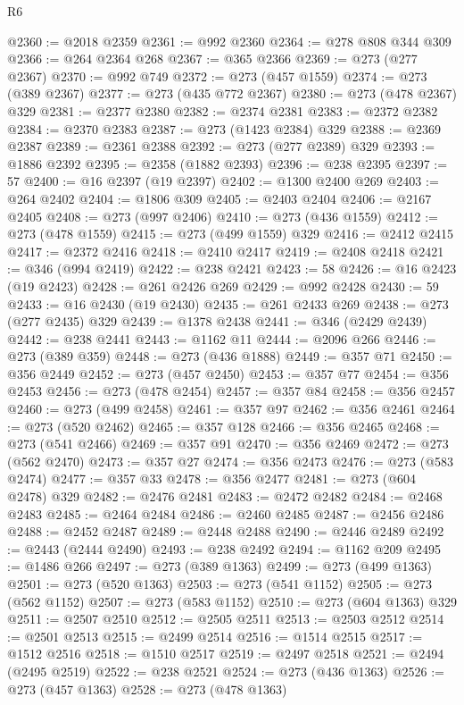 \begin{lexlean}{R6}
\begin{coremodule}
{{{{{{{{{{{{{{{{{{{@2360 := @2018 @2359
@2361 := @992 @2360
@2364 := @278 @808 @344 @309
@2366 := @264 @2364 @268
@2367 := @365 @2366
@2369 := @273 (@277 @2367)
@2370 := @992 @749
@2372 := @273 (@457 @1559)
@2374 := @273 (@389 @2367)
@2377 := @273 (@435 @772 @2367)
@2380 := @273 (@478 @2367) @329
@2381 := @2377 @2380
@2382 := @2374 @2381
@2383 := @2372 @2382
@2384 := @2370 @2383
@2387 := @273 (@1423 @2384) @329
@2388 := @2369 @2387
@2389 := @2361 @2388
@2392 := @273 (@277 @2389) @329
@2393 := @1886 @2392
@2395 := @2358 (@1882 @2393)
@2396 := @238 @2395
@2397 := 57
@2400 := @16 @2397 (@19 @2397)
@2402 := @1300 @2400 @269
@2403 := @264 @2402
@2404 := @1806 @309
@2405 := @2403 @2404
@2406 := @2167 @2405
@2408 := @273 (@997 @2406)
@2410 := @273 (@436 @1559)
@2412 := @273 (@478 @1559)
@2415 := @273 (@499 @1559) @329
@2416 := @2412 @2415
@2417 := @2372 @2416
@2418 := @2410 @2417
@2419 := @2408 @2418
@2421 := @346 (@994 @2419)
@2422 := @238 @2421
@2423 := 58
@2426 := @16 @2423 (@19 @2423)
@2428 := @261 @2426 @269
@2429 := @992 @2428
@2430 := 59
@2433 := @16 @2430 (@19 @2430)
@2435 := @261 @2433 @269
@2438 := @273 (@277 @2435) @329
@2439 := @1378 @2438
@2441 := @346 (@2429 @2439)
@2442 := @238 @2441
@2443 := @1162 @11
@2444 := @2096 @266
@2446 := @273 (@389 @359)
@2448 := @273 (@436 @1888)
@2449 := @357 @71
@2450 := @356 @2449
@2452 := @273 (@457 @2450)
@2453 := @357 @77
@2454 := @356 @2453
@2456 := @273 (@478 @2454)
@2457 := @357 @84
@2458 := @356 @2457
@2460 := @273 (@499 @2458)
@2461 := @357 @97
@2462 := @356 @2461
@2464 := @273 (@520 @2462)
@2465 := @357 @128
@2466 := @356 @2465
@2468 := @273 (@541 @2466)
@2469 := @357 @91
@2470 := @356 @2469
@2472 := @273 (@562 @2470)
@2473 := @357 @27
@2474 := @356 @2473
@2476 := @273 (@583 @2474)
@2477 := @357 @33
@2478 := @356 @2477
@2481 := @273 (@604 @2478) @329
@2482 := @2476 @2481
@2483 := @2472 @2482
@2484 := @2468 @2483
@2485 := @2464 @2484
@2486 := @2460 @2485
@2487 := @2456 @2486
@2488 := @2452 @2487
@2489 := @2448 @2488
@2490 := @2446 @2489
@2492 := @2443 (@2444 @2490)
@2493 := @238 @2492
@2494 := @1162 @209
@2495 := @1486 @266
@2497 := @273 (@389 @1363)
@2499 := @273 (@499 @1363)
@2501 := @273 (@520 @1363)
@2503 := @273 (@541 @1152)
@2505 := @273 (@562 @1152)
@2507 := @273 (@583 @1152)
@2510 := @273 (@604 @1363) @329
@2511 := @2507 @2510
@2512 := @2505 @2511
@2513 := @2503 @2512
@2514 := @2501 @2513
@2515 := @2499 @2514
@2516 := @1514 @2515
@2517 := @1512 @2516
@2518 := @1510 @2517
@2519 := @2497 @2518
@2521 := @2494 (@2495 @2519)
@2522 := @238 @2521
@2524 := @273 (@436 @1363)
@2526 := @273 (@457 @1363)
@2528 := @273 (@478 @1363)
}}}}}}}}}}}}}}}}}}}
\end{coremodule}
\end{lexlean}
